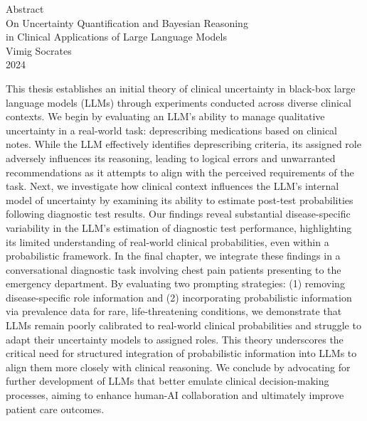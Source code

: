 \begin{center}
	Abstract\\
	On Uncertainty Quantification and Bayesian Reasoning \\ in Clinical Applications of Large Language Models \\
	Vimig Socrates \\
	2024
\end{center}

\begin{spacing}{2}

This thesis establishes an initial theory of clinical uncertainty in black-box large language models (LLMs) through experiments conducted across diverse clinical contexts. We begin by evaluating an LLM's ability to manage qualitative uncertainty in a real-world task: deprescribing medications based on clinical notes. While the LLM effectively identifies deprescribing criteria, its assigned role adversely influences its reasoning, leading to logical errors and unwarranted recommendations as it attempts to align with the perceived requirements of the task. Next, we investigate how clinical context influences the LLM's internal model of uncertainty by examining its ability to estimate post-test probabilities following diagnostic test results. Our findings reveal substantial disease-specific variability in the LLM's estimation of diagnostic test performance, highlighting its limited understanding of real-world clinical probabilities, even within a probabilistic framework. In the final chapter, we integrate these findings in a conversational diagnostic task involving chest pain patients presenting to the emergency department. By evaluating two prompting strategies: (1) removing disease-specific role information and (2) incorporating probabilistic information via prevalence data for rare, life-threatening conditions, we demonstrate that LLMs remain poorly calibrated to real-world clinical probabilities and struggle to adapt their uncertainty models to assigned roles. This theory underscores the critical need for structured integration of probabilistic information into LLMs to align them more closely with clinical reasoning. We conclude by advocating for further development of LLMs that better emulate clinical decision-making processes, aiming to enhance human-AI collaboration and ultimately improve patient care outcomes.

\end{spacing}

